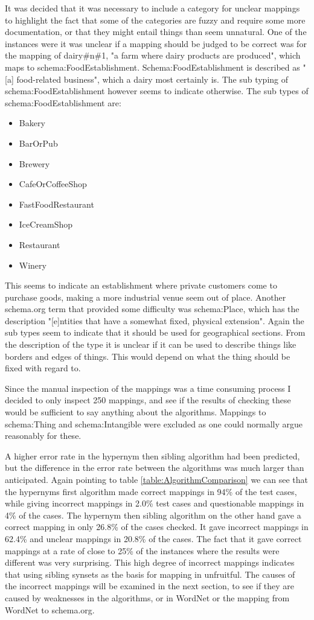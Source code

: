 It was decided that it was necessary to include a category for unclear mappings to highlight the fact that some of the categories
are fuzzy and require some more documentation, or that they might entail things than seem unnatural.
One of the instances were it was unclear if a mapping should be judged to be correct was for the mapping of dairy\#n\#1,
"a farm where dairy products are produced", which maps to schema:FoodEstablishment.
Schema:FoodEstablishment is described as "[a] food-related business", which a dairy most certainly is.
The sub typing of schema:FoodEstablishment however seems to indicate otherwise.
The sub types of schema:FoodEstablishment are:
\begin{itemize}
	\item Bakery
	\item BarOrPub
	\item Brewery
	\item CafeOrCoffeeShop
	\item FastFoodRestaurant
	\item IceCreamShop
	\item Restaurant
	\item Winery
\end{itemize}
This seems to indicate an establishment where private customers come to purchase goods,
making a more industrial venue seem out of place.
Another schema.org term that provided some difficulty was schema:Place,
which has the description "[e]ntities that have a somewhat fixed, physical extension".
Again the sub types seem to indicate that it should be used for geographical sections.
From the description of the type it is unclear if it can be used to describe things like borders and edges of things.
This would depend on what the thing should be fixed with regard to.

Since the manual inspection of the mappings was a time consuming process I decided to only inspect 250 mappings,
and see if the results of checking these would be sufficient to say anything about the algorithms.
Mappings to schema:Thing and schema:Intangible were excluded as one could normally argue reasonably for these.

A higher error rate in the hypernym then sibling algorithm had been predicted,
but the difference in the error rate between the algorithms was much larger than anticipated.
Again pointing to table \ref{table:AlgorithmComparison} we can see that the hypernyms first algorithm
made correct mappings in 94\% of the test cases,
while giving incorrect mappings in 2.0\% test cases and questionable mappings in 4\% of the cases.
The hypernym then sibling algorithm on the other hand gave a correct mapping in only 26.8\% of the cases checked.
It gave incorrect mappings in 62.4\% and unclear mappings in 20.8\% of the cases.
The fact that it gave correct mappings at a rate of close to 25\% of the instances where the results were different was very surprising.
This high degree of incorrect mappings indicates that using sibling synsets as the basis for mapping in unfruitful.
The causes of the incorrect mappings will be examined in the next section,
to see if they are caused by weaknesses in the algorithms, or in WordNet or the mapping from WordNet to schema.org.

